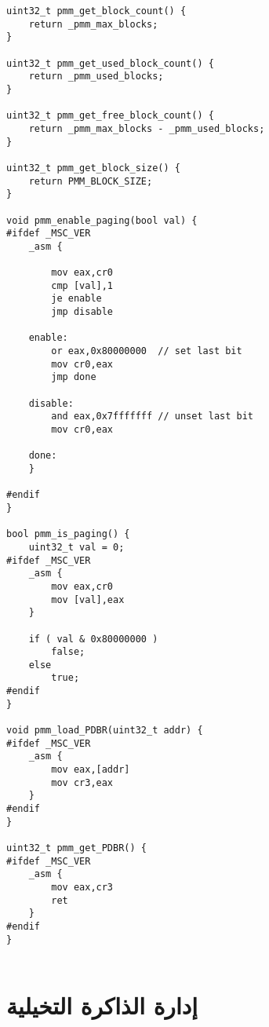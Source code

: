 \documentclass[document.tex]{subfiles}
\begin{document}
\begin{english}
\begin{lstlisting}[label=lst:pmm.cpp,caption=\en{Physical Memory Manager Implemetation}]
uint32_t pmm_get_block_count() {
	return _pmm_max_blocks;
}

uint32_t pmm_get_used_block_count() {
	return _pmm_used_blocks;
}

uint32_t pmm_get_free_block_count() {
	return _pmm_max_blocks - _pmm_used_blocks;
}

uint32_t pmm_get_block_size() {
	return PMM_BLOCK_SIZE;
}

void pmm_enable_paging(bool val) {
#ifdef _MSC_VER
	_asm {
	
		mov eax,cr0
		cmp [val],1
		je enable
		jmp disable
	
	enable:
		or eax,0x80000000  // set last bit
		mov cr0,eax
		jmp done
		
	disable:
		and eax,0x7fffffff // unset last bit
		mov cr0,eax
	
	done:
	}
	
#endif
}

bool pmm_is_paging() {
	uint32_t val = 0;
#ifdef _MSC_VER
	_asm {
		mov eax,cr0
		mov [val],eax
	}
	
	if ( val & 0x80000000 )
		false;
	else
		true;
#endif
}

void pmm_load_PDBR(uint32_t addr) {
#ifdef _MSC_VER
	_asm {
		mov eax,[addr]
		mov cr3,eax
	}
#endif
}

uint32_t pmm_get_PDBR() {
#ifdef _MSC_VER
	_asm {
		mov eax,cr3
		ret
	}
#endif
}


\end{lstlisting}
\end{english}

\section{إدارة الذاكرة التخيلية }
\end{document}
